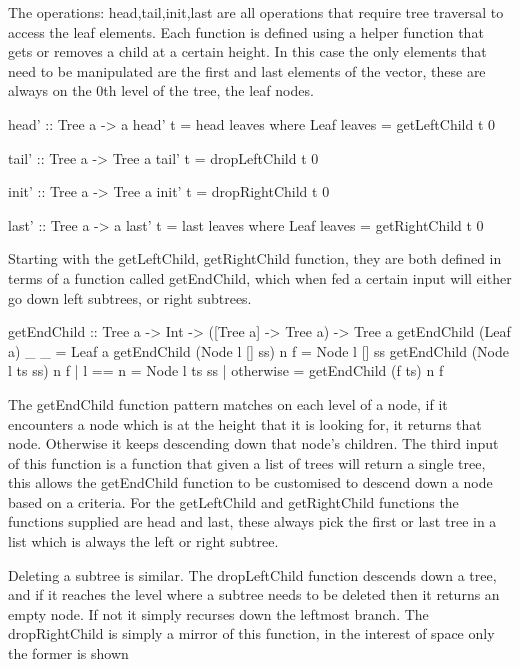 \documentclass[11pt,a4paper,oneside]{article}
\begin{document}
The operations: head,tail,init,last are all operations that require tree traversal to access the leaf elements. Each function is defined using a helper function that gets or removes a child at a certain height. In this case the only elements that need to be manipulated are the first and last elements of the vector, these are always on the 0th level of the tree, the leaf nodes.

\begin{haskell}

head' :: Tree a -> a
head' t = head leaves
    where Leaf leaves = getLeftChild t 0

tail' :: Tree a -> Tree a
tail' t = dropLeftChild t 0

init' :: Tree a -> Tree a
init' t = dropRightChild t 0

last' :: Tree a -> a
last' t = last leaves
    where Leaf leaves = getRightChild t 0

\end{haskell}

Starting with the getLeftChild, getRightChild function, they are both defined in terms of a function called getEndChild, which when fed a certain input will either go down left subtrees, or right subtrees. 

\begin{haskell}

getEndChild :: Tree a -> Int -> ([Tree a] -> Tree a) -> Tree a
getEndChild (Leaf a) _ _       = Leaf a
getEndChild (Node l [] ss) n f = Node l [] ss
getEndChild (Node l ts ss) n f | l == n    = Node l ts ss
                               | otherwise = getEndChild (f ts) n f

\end{haskell}

The getEndChild function pattern matches on each level of a node, if it encounters a node which is at the height that it is looking for, it returns that node. Otherwise it keeps descending down that node's children. The third input of this function is a function that given a list of trees will return a single tree, this allows the getEndChild function to be customised to descend down a node based on a criteria. For the getLeftChild and getRightChild functions the functions supplied are head and last, these always pick the first or last tree in a list which is always the left or right subtree.


Deleting a subtree is similar. The dropLeftChild function descends down a tree, and if it reaches the level where a subtree needs to be deleted then it returns an empty node. If not it simply recurses down the leftmost branch. The dropRightChild is simply a mirror of this function, in the interest of space only the former is shown
\end{document}
